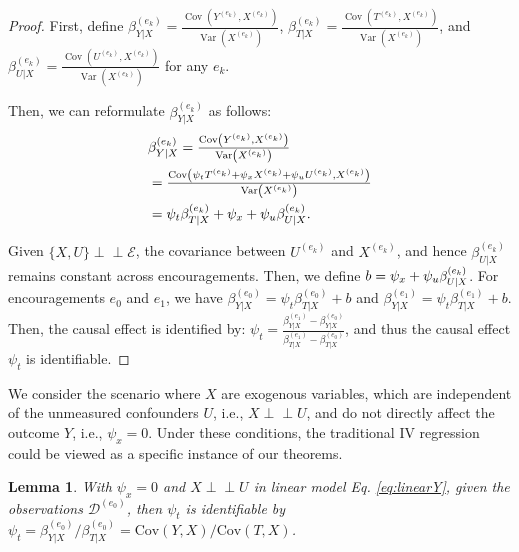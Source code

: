 \documentclass[journal]{IEEEtran}
\newtheorem{lemma}{Lemma}
\newcommand*{\Scale}[2][4]{\scalebox{#1}{$#2$}}
\newcommand{\indep}{\perp \!\!\! \perp}
\begin{document}
\begin{proof}
    First, define $\beta_{Y|X}^{(e_k)} = \frac{\operatorname{Cov}\left(Y^{(e_k)}, X^{(e_k)}\right)}{\operatorname{Var}\left(X^{(e_k)}\right)}$, $\beta_{T|X}^{(e_k)} = \frac{\operatorname{Cov}\left(T^{(e_k)}, X^{(e_k)}\right)}{\operatorname{Var}\left(X^{(e_k)}\right)}$, and $\beta_{U|X}^{(e_k)} = \frac{\operatorname{Cov}\left(U^{(e_k)}, X^{(e_k)}\right)}{\operatorname{Var}\left(X^{(e_k)}\right)}$ for any $e_k$.

    Then, we can reformulate $\beta_{Y|X}^{(e_k)}$ as follows:
    \begin{equation}
    \begin{aligned}
    & \Scale[1.0]{{\beta_{Y|X}^{(e_k)} = \frac{\operatorname{Cov}\left(Y^{(e_k)}, X^{(e_k)}\right)}{\operatorname{Var}\left(X^{(e_k)}\right)}}}   \\ 
    & =  \Scale[1.0]{\frac{{\operatorname{Cov}\left(\psi_t T^{(e_k)}+\psi_x X^{(e_k)}+\psi_u U^{(e_k)}, X^{(e_k)} \right)}}{{\operatorname{Var}\left(X^{(e_k)}\right)}}}  \\  
    & =  \Scale[1.0]{ 
    \psi_t \beta_{T|X}^{(e_k)} 
    + \psi_x+\psi_u \beta_{U|X}^{(e_k)}}.
    \end{aligned}
    \label{eq:4}
    \end{equation}
  
    Given $\{X, U\} \indep \mathcal{E}$, the covariance between $U^{(e_k)}$ and $X^{(e_k)}$, and hence $\beta_{U|X}^{(e_k)}$ remains constant across encouragements. Then, we define $b = \psi_x+\psi_u \Scale[0.93]{\beta_{U|X}^{(e_k)}}$. For encouragements $e_0$ and $e_1$, we have $\beta_{Y|X}^{(e_0)} = \psi_t \beta_{T|X}^{(e_0)} + b$ and
    $\beta_{Y|X}^{(e_1)} = \psi_t \beta_{T|X}^{(e_1)} + b$. Then, the causal effect is identified by: $\psi_t = \frac{\beta_{Y|X}^{(e_1)} - \beta_{Y|X}^{(e_0)}}{\beta_{T|X}^{(e_1)} - \beta_{T|X}^{(e_0)}}$, and thus the causal effect $\psi_t$ is identifiable. 
\end{proof}

We consider the scenario where $X$ are exogenous variables, which are independent of the unmeasured confounders $ U $, i.e., $ X \indep U $, and do not directly affect the outcome $Y$, i.e., $\psi_x=0$. Under these conditions, the traditional IV regression could be viewed as a specific instance of our theorems.


\begin{lemma}
\label{lemma:1}
    With $\psi_x=0$ and $X \indep U$ in linear model Eq. \eqref{eq:linearY}, given the observations $\mathcal{D}^{(e_0)}$, then $\psi_t$ is identifiable by $\psi_t = \beta_{Y|X}^{(e_0)} / \beta_{T|X}^{(e_0)} = \text{Cov}(Y, X)/\text{Cov}(T, X)$.
\end{lemma}
\end{document}
